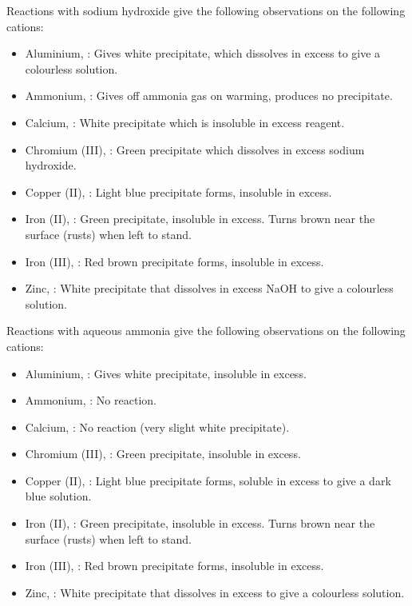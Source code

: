Reactions with sodium hydroxide give the following observations on the following cations:
\begin{itemize}
	\item Aluminium, : Gives white precipitate, which dissolves in excess to give a
		colourless solution.
	\item Ammonium, : Gives off ammonia gas on warming, produces no precipitate.
	\item Calcium, : White precipitate which is insoluble in excess reagent.
	\item Chromium (III), : Green precipitate which dissolves in excess sodium 
		hydroxide.
	\item Copper (II), : Light blue precipitate forms, insoluble in excess.
	\item Iron (II), : Green precipitate, insoluble in excess. Turns brown near the 
		surface (rusts) when left to stand.
	\item Iron (III), : Red brown precipitate forms, insoluble in excess.
	\item Zinc, : White precipitate that dissolves in excess NaOH to give a colourless
		solution.
\end{itemize}

Reactions with aqueous ammonia give the following observations on the following cations:
\begin{itemize}
	\item Aluminium, : Gives white precipitate, insoluble in excess.
	\item Ammonium, : No reaction.
	\item Calcium, : No reaction (very slight white precipitate).
	\item Chromium (III), : Green precipitate, insoluble in excess.
	\item Copper (II), : Light blue precipitate forms, soluble in excess to give a
		dark blue solution.
	\item Iron (II), : Green precipitate, insoluble in excess. Turns brown near the 
		surface (rusts) when left to stand.
	\item Iron (III), : Red brown precipitate forms, insoluble in excess.
	\item Zinc, : White precipitate that dissolves in excess  to give a 
		colourless solution.
\end{itemize}

